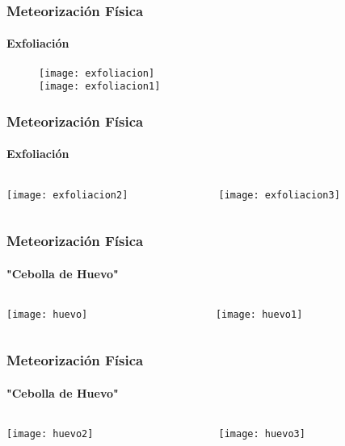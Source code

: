 \documentclass{beamer}
\begin{document}
\begin{frame}
\frametitle{Meteorización Física}
\framesubtitle{Exfoliación}
\begin{figure}
\begin{center}
   	\texttt{[image: exfoliacion]}\\
   	\texttt{[image: exfoliacion1]}
\end{center}
\end{figure}
\end{frame}
\begin{frame}
\frametitle{Meteorización Física}
\framesubtitle{Exfoliación}
\begin{columns}
\begin{column}{.5\linewidth}
\begin{center}
\texttt{[image: exfoliacion2]}
\end{center}
\end{column}
\begin{column}{.5\linewidth}
\begin{center}
\texttt{[image: exfoliacion3]}
\end{center}
\end{column}
\end{columns}
\end{frame}
\begin{frame}
\frametitle{Meteorización Física}
\framesubtitle{"Cebolla de Huevo"}
\begin{columns}
\begin{column}{.5\linewidth}
\begin{center}
\texttt{[image: huevo]}
\end{center}
\end{column}
\begin{column}{.5\linewidth}
\begin{center}
\texttt{[image: huevo1]}
\end{center}
\end{column}
\end{columns}
\end{frame}
\begin{frame}
\frametitle{Meteorización Física}
\framesubtitle{"Cebolla de Huevo"}
\begin{columns}
\begin{column}{.5\linewidth}
\begin{center}
\texttt{[image: huevo2]}
\end{center}
\end{column}
\begin{column}{.5\linewidth}
\begin{center}
\texttt{[image: huevo3]}
\end{center}
\end{column}
\end{columns}
\end{frame}
\end{document}
